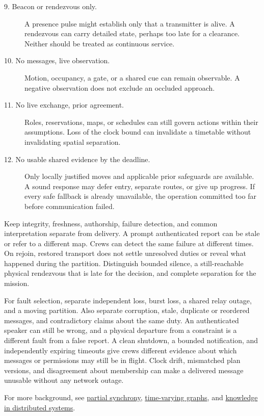 \documentclass[11pt]{article}
\begin{document}
\begin{description}
\item[9. Beacon or rendezvous only.] A presence pulse might establish only that a transmitter is alive. A rendezvous can carry detailed state, perhaps too late for a clearance. Neither should be treated as continuous service.
\item[10. No messages, live observation.] Motion, occupancy, a gate, or a shared cue can remain observable. A negative observation does not exclude an occluded approach.
\item[11. No live exchange, prior agreement.] Roles, reservations, maps, or schedules can still govern actions within their assumptions. Loss of the clock bound can invalidate a timetable without invalidating spatial separation.
\item[12. No usable shared evidence by the deadline.] Only locally justified moves and applicable prior safeguards are available. A sound response may defer entry, separate routes, or give up progress. If every safe fallback is already unavailable, the operation committed too far before communication failed.
\end{description}

Keep integrity, freshness, authorship, failure detection, and common interpretation separate from delivery. A prompt authenticated report can be stale or refer to a different map. Crews can detect the same failure at different times. On rejoin, restored transport does not settle unresolved duties or reveal what happened during the partition. Distinguish bounded silence, a still-reachable physical rendezvous that is late for the decision, and complete separation for the mission.


For fault selection, separate independent loss, burst loss, a shared relay outage, and a moving partition. Also separate corruption, stale, duplicate or reordered messages, and contradictory claims about the same duty. An authenticated speaker can still be wrong, and a physical departure from a constraint is a different fault from a false report. A clean shutdown, a bounded notification, and independently expiring timeouts give crews different evidence about which messages or permissions may still be in flight. Clock drift, mismatched plan versions, and disagreement about membership can make a delivered message unusable without any network outage.

For more background, see \href{https://dspace.mit.edu/entities/publication/108bf327-aff6-414b-a48f-b357a821c48e}{partial synchrony}, \href{https://arxiv.org/abs/1012.0009}{time-varying graphs}, and \href{https://arxiv.org/abs/cs/0006009}{knowledge in distributed systems}.
\end{document}
